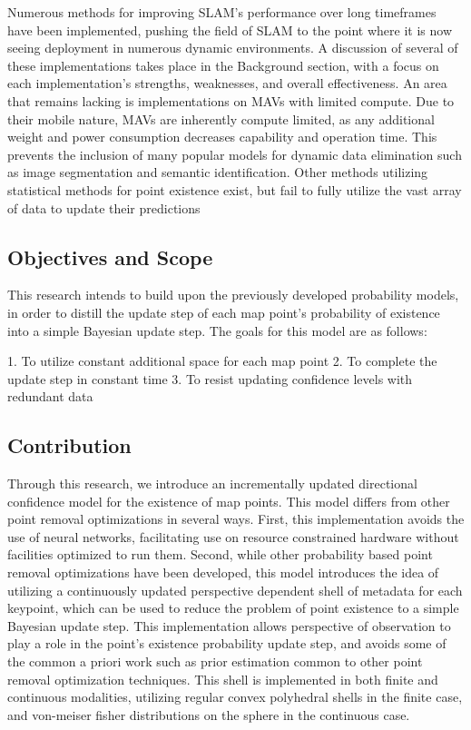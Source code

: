 \documentclass[12pt]{article}
\begin{document}
Numerous methods for improving SLAM's performance over long timeframes have been implemented, pushing the field of SLAM to the point where it is now seeing deployment in numerous dynamic environments. A discussion of several of these implementations takes place in the Background section, with a focus on each implementation's strengths, weaknesses, and overall effectiveness. An area that remains lacking is implementations on MAVs with limited compute. Due to their mobile nature, MAVs are inherently compute limited, as any additional weight and power consumption decreases capability and operation time. This prevents the inclusion of many popular models for dynamic data elimination such as image segmentation and semantic identification. Other methods utilizing statistical methods for point existence exist, but fail to fully utilize the vast array of data to update their predictions

\subsection{Objectives and Scope}

This research intends to build upon the previously developed probability models, in order to distill the update step of each map point's probability of existence into a simple Bayesian update step. The goals for this model are as follows:

1. To utilize constant additional space for each map point
2. To complete the update step in constant time
3. To resist updating confidence levels with redundant data

\subsection{Contribution}

Through this research, we introduce an incrementally updated directional confidence model for the existence of map points. This model differs from other point removal optimizations in several ways. First, this implementation avoids the use of neural networks, facilitating use on resource constrained hardware without facilities optimized to run them. Second, while other probability based point removal optimizations have been developed, this model introduces the idea of utilizing a continuously updated perspective dependent shell of metadata for each keypoint, which can be used to reduce the problem of point existence to a simple Bayesian update step. This implementation allows perspective of observation to play a role in the point's existence probability update step, and avoids some of the common a priori work such as prior estimation common to other point removal optimization techniques. This shell is implemented in both finite and continuous modalities, utilizing regular convex polyhedral shells in the finite case, and von-meiser fisher distributions on the sphere in the continuous case.
\end{document}
